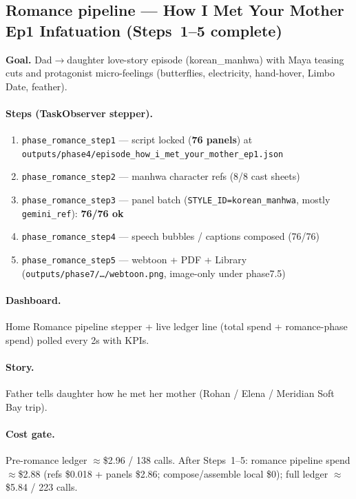 \documentclass[10pt,twocolumn,letterpaper]{article}
\begin{document}
\subsection{Romance pipeline --- How I Met Your Mother Ep1 Infatuation (Steps~1--5 complete)}
\textbf{Goal.} Dad$\rightarrow$daughter love-story episode (korean\_manhwa) with Maya teasing cuts and protagonist micro-feelings (butterflies, electricity, hand-hover, Limbo Date, feather).

\paragraph{Steps (TaskObserver stepper).}
\begin{enumerate}[leftmargin=*,itemsep=1pt]
  \item \texttt{phase\_romance\_step1} --- script locked (\textbf{76 panels}) at \texttt{outputs/phase4/episode\_how\_i\_met\_your\_mother\_ep1.json}
  \item \texttt{phase\_romance\_step2} --- manhwa character refs (8/8 cast sheets)
  \item \texttt{phase\_romance\_step3} --- panel batch (\texttt{STYLE\_ID=korean\_manhwa}, mostly \texttt{gemini\_ref}): \textbf{76/76 ok}
  \item \texttt{phase\_romance\_step4} --- speech bubbles / captions composed (76/76)
  \item \texttt{phase\_romance\_step5} --- webtoon + PDF + Library (\texttt{outputs/phase7/\ldots/webtoon.png}, image-only under phase7.5)
\end{enumerate}

\paragraph{Dashboard.} Home Romance pipeline stepper + live ledger line (total spend + romance-phase spend) polled every 2s with KPIs.

\paragraph{Story.} Father tells daughter how he met her mother (Rohan / Elena / Meridian Soft Bay trip).

\paragraph{Cost gate.} Pre-romance ledger $\approx$\$2.96 / 138 calls.
After Steps~1--5: romance pipeline spend $\approx$\$2.88 (refs \$0.018 + panels \$2.86; compose/assemble local \$0);
full ledger $\approx$\$5.84 / 223 calls.
\end{document}
